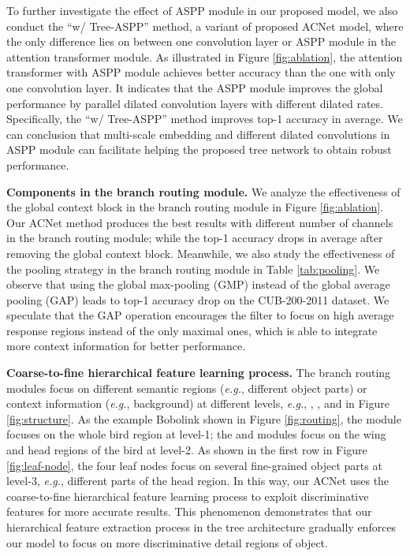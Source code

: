 \documentclass[10pt,twocolumn,letterpaper]{article}
\def\eg{{\em e.g.}}
\begin{document}
To further investigate the effect of ASPP module in our proposed model, we also conduct the ``w/ Tree-ASPP'' method, a variant of proposed ACNet model, where the only difference lies on between one convolution layer or ASPP module in the attention transformer module. As illustrated in Figure \ref{fig:ablation}, the attention transformer with ASPP module achieves better accuracy than the one with only one convolution layer. It indicates that the ASPP module improves the global performance by parallel dilated convolution layers with different dilated rates. Specifically, the ``w/ Tree-ASPP'' method improves  top-1 accuracy in average. We can conclusion that multi-scale embedding and different dilated convolutions in ASPP module can facilitate helping the proposed tree network to obtain robust performance.

{\flushleft \textbf{Components in the branch routing module.}} We analyze the effectiveness of the global context block \cite{DBLP:journals/corr/abs-1904-11492} in the branch routing module in Figure \ref{fig:ablation}. Our ACNet method produces the best results with different number of channels in the branch routing module; while the top-1 accuracy drops  in average after removing the global context block. Meanwhile, we also study the effectiveness of the pooling strategy in the branch routing module in Table \ref{tab:pooling}. We observe that using the global max-pooling (GMP) instead of the global average pooling (GAP) leads to  top-1 accuracy drop on the CUB-200-2011 dataset. We speculate that the GAP operation encourages the filter to focus on high average response regions instead of the only maximal ones, which is able to integrate more context information for better performance.

{\flushleft \textbf{Coarse-to-fine hierarchical feature learning process.}}
The branch routing modules focus on different semantic regions (\eg, different object parts) or context information (\eg, background) at different levels, \eg, , , and  in Figure \ref{fig:structure}. As the example Bobolink shown in Figure \ref{fig:routing}, the  module focuses on the whole bird region at level-1; the  and  modules focus on the wing and head regions of the bird at level-2. As shown in the first row in Figure \ref{fig:leaf-node}, the four leaf nodes focus on several fine-grained object parts at level-3, \eg, different parts of the head region. In this way, our ACNet uses the coarse-to-fine hierarchical feature learning process to exploit discriminative features for more accurate results. This phenomenon demonstrates that our hierarchical feature extraction process in the tree  architecture gradually enforces our model to focus on more discriminative detail regions of object. 
\end{document}
